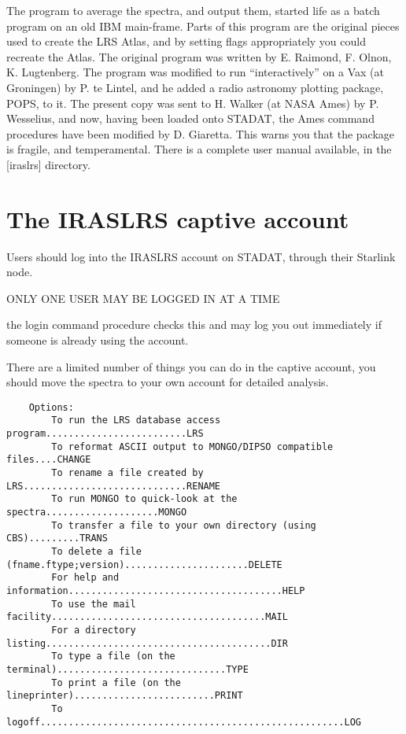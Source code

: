 The program to average the spectra, and output them, started life as a batch
program on an old IBM main-frame.
Parts of this program are the original pieces used to create the LRS Atlas,
and by setting flags appropriately you could recreate the Atlas.
The original program was written by E. Raimond, F. Olnon, K. Lugtenberg.
The program was modified to run ``interactively'' on a Vax (at Groningen)
by P. te Lintel, and he added a radio astronomy plotting package, POPS, to it.
The present copy was sent to H. Walker (at NASA Ames) by P. Wesselius, and
now, having been loaded onto STADAT, the Ames command procedures have been
modified by D. Giaretta.
This warns you that the package is fragile, and temperamental.
There is a complete user manual available, in the [iraslrs] directory.

\section{The IRASLRS captive account}

Users should log into the IRASLRS account on STADAT, through their Starlink
node.
\begin{center}
ONLY ONE USER MAY BE LOGGED IN AT A TIME
\end{center}
the login command procedure checks this and may log you out
immediately if someone is already using the account.

There are a limited number of things you can do in the captive account, you
should move the spectra to your own account for detailed analysis.
\begin{verbatim}
    Options:
        To run the LRS database access program.........................LRS
        To reformat ASCII output to MONGO/DIPSO compatible files....CHANGE
        To rename a file created by LRS.............................RENAME
        To run MONGO to quick-look at the spectra....................MONGO
        To transfer a file to your own directory (using CBS).........TRANS
        To delete a file (fname.ftype;version)......................DELETE
        For help and information......................................HELP
        To use the mail facility......................................MAIL
        For a directory listing........................................DIR
        To type a file (on the terminal)..............................TYPE
        To print a file (on the lineprinter).........................PRINT
        To logoff......................................................LOG
\end{verbatim}

